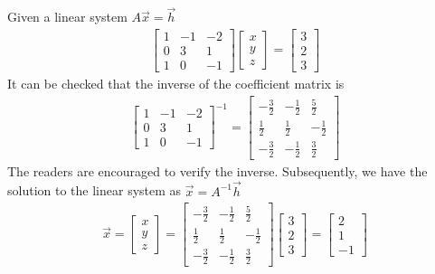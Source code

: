 \begin{exmp}
Given a linear system $A\vec{x} = \vec{h}$
\begin{align*}
\begin{bmatrix}
1 & -1 & -2 \\
0 & 3 & 1 \\
1 & 0 & -1
\end{bmatrix}
\begin{bmatrix}
x \\
y \\
z
\end{bmatrix}
=
\begin{bmatrix}
3 \\
2 \\
3
\end{bmatrix}
\end{align*}
It can be checked that the inverse of the coefficient matrix is
\begin{align*}
\begin{bmatrix}
1 & -1 & -2 \\
0 & 3 & 1 \\
1 & 0 & -1
\end{bmatrix}^{-1}   
=
\begin{bmatrix}
-\frac{3}{2} & -\frac{1}{2} & \frac{5}{2} \\
\frac{1}{2} & \frac{1}{2} & -\frac{1}{2} \\
-\frac{3}{2} & -\frac{1}{2} & \frac{3}{2}
\end{bmatrix}
\end{align*}
The readers are encouraged to verify the inverse. Subsequently, we have the solution to the linear system as $\vec{x} = A^{-1}\vec{h}$
\begin{align*}
\vec{x} = 
\begin{bmatrix}
x \\
y \\
z
\end{bmatrix}
=    
\begin{bmatrix}
-\frac{3}{2} & -\frac{1}{2} & \frac{5}{2} \\
\frac{1}{2} & \frac{1}{2} & -\frac{1}{2} \\
-\frac{3}{2} & -\frac{1}{2} & \frac{3}{2}
\end{bmatrix}
\begin{bmatrix}
3 \\
2 \\
3
\end{bmatrix}
=
\begin{bmatrix}
2 \\
1 \\
-1
\end{bmatrix}
\end{align*}
\end{exmp}
